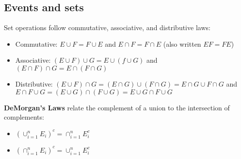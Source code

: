 \documentclass{article}
\begin{document}
\subsection{Events and sets}
Set operations follow commutative, associative, and distributive laws:
\begin{itemize}
    \item Commutative: $E \cup F = F \cup E$ and $E\cap F = F \cap E $ (also written $EF = FE$)
    \item Associative: $(E\cup F)\cup G = E \cup (f\cup G)$ and $(E\cap F)\cap G = E\cap(F\cap G)$
    \item Distributive: $(E\cup F)\cap G = (E\cap G) \cup (F \cap G) = E\cap G \cup F \cap G$ and $E\cap F\cup G = (E\cup G) \cap (F \cup G) = E\cup G \cap F \cup G$
\end{itemize}
\textbf{DeMorgan's Laws} relate the complement of a union to the intersection of complements:
\begin{itemize}
    \item $(\cup_{i=1}^n E_i)^c = \cap_{i=1}^nE_i^c$
    \item $(\cap_{i=1}^n E_i)^c = \cup_{i=1}^nE_i^c$
\end{itemize}

\end{document}
